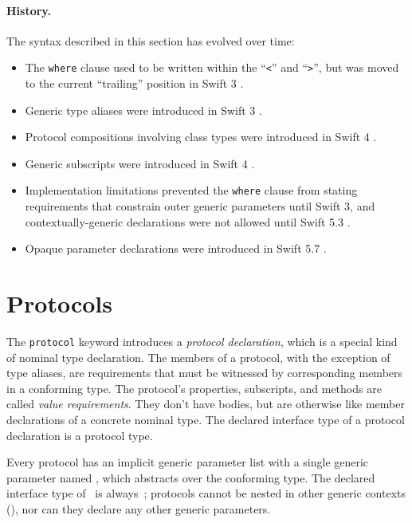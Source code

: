 \documentclass[../generics]{subfiles}
\begin{document}
\paragraph{History.} The syntax described in this section has evolved over time:
\begin{itemize}
\item The \texttt{where} clause used to be written within the ``\texttt{<}'' and ``\texttt{>}'', but was moved to the current ``trailing'' position in Swift 3 \cite{se0081}.
\item Generic type aliases were introduced in Swift 3 \cite{se0048}.
\item {}Protocol compositions involving class types were introduced in Swift 4 \cite{se0156}.
\item Generic subscripts were introduced in Swift 4 \cite{se0148}.
\item Implementation limitations prevented the \texttt{where} clause from stating requirements that constrain outer generic parameters until Swift 3, and contextually-generic declarations were not allowed until Swift 5.3 \cite{se0261}.
\item {}Opaque parameter declarations were introduced in Swift 5.7 \cite{se0341}.
\end{itemize}

\section{Protocols}\label{protocols}

The \texttt{protocol} keyword introduces a \emph{protocol declaration}, which is a special kind of nominal type declaration. The members of a protocol, with the exception of type aliases, are requirements that must be witnessed by corresponding members in a conforming type. The protocol's properties, subscripts, and methods are called  \emph{value requirements}. They don't have bodies, but are otherwise like member declarations of a concrete nominal type. The declared interface type of a protocol declaration is a protocol type.

Every protocol has an implicit generic parameter list with a single generic parameter named \tSelf, which abstracts over the conforming type. The declared interface type of \tSelf\ is always~\rT; protocols cannot be nested in other generic contexts (), nor can they declare any other generic parameters.
\end{document}
